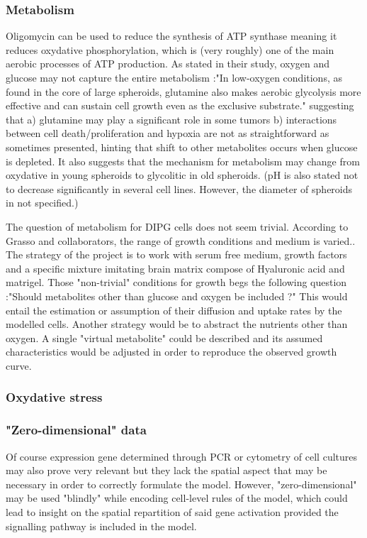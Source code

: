 \documentclass[11pt,a4paper]{article}
\begin{document}
\subsubsection{Metabolism}
Oligomycin can be used to reduce the synthesis of ATP synthase meaning it reduces oxydative phosphorylation, which is (very roughly) one of the main aerobic processes of ATP production.\cite{Tidwell2022} As stated  in their study, oxygen and glucose may not capture the entire metabolism :"In low-oxygen conditions, as found in the core of large spheroids, glutamine also makes aerobic glycolysis more effective and can sustain cell growth even as the exclusive substrate." suggesting that a) glutamine may play a significant role in some tumors b) interactions between cell death/proliferation and hypoxia are not as straightforward as sometimes presented, hinting that shift to other metabolites occurs when glucose is depleted.\cite{Damiani2017}\cite{Rodriguez2008} It also suggests that the mechanism for metabolism may change from oxydative in young spheroids to glycolitic in old spheroids. \cite{Rodriguez2008} (pH is also stated not to decrease significantly in several cell lines. However, the diameter of spheroids in not specified.)

The question of metabolism for DIPG cells does not seem trivial. According to Grasso and collaborators, the range of growth conditions and medium is varied.\cite{Grasso2015}. The strategy of the project is to work with serum free medium, growth factors and a specific mixture imitating brain matrix compose of Hyaluronic acid and matrigel. Those "non-trivial" conditions for growth begs the following question :"Should metabolites other than glucose and oxygen be included ?" This would entail the estimation or assumption of their diffusion and uptake rates by the modelled cells. Another strategy would be to abstract the nutrients other than oxygen. A single "virtual metabolite" could be described and its assumed characteristics would be adjusted in order to reproduce the observed growth curve. 


\subsubsection{Oxydative stress} 

\subsubsection{"Zero-dimensional" data}
Of course expression gene determined through PCR or cytometry of cell cultures may also prove very relevant but they lack the spatial aspect that may be necessary in order to correctly formulate the model. However, "zero-dimensional" may be used "blindly" while encoding cell-level rules of the model, which could lead to insight on the spatial repartition of said gene activation provided the signalling pathway is included in the model. 
\end{document}

